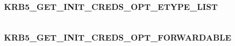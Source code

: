\documentclass[letterpaper,10pt,english]{sphinxmanual}
\begin{document}
\begin{fulllineitems}
\label{appdev/refs/macros/KRB5_GET_INIT_CREDS_OPT_CHG_PWD_PRMPT:KRB5_GET_INIT_CREDS_OPT_CHG_PWD_PRMPT}
\end{fulllineitems}


\begin{tabulary}{\linewidth}{|L|L|}
\hline

 & 
\\
\hline\end{tabulary}



\subsubsection{KRB5\_GET\_INIT\_CREDS\_OPT\_ETYPE\_LIST}
\label{appdev/refs/macros/KRB5_GET_INIT_CREDS_OPT_ETYPE_LIST:krb5-get-init-creds-opt-etype-list-data}\label{appdev/refs/macros/KRB5_GET_INIT_CREDS_OPT_ETYPE_LIST:krb5-get-init-creds-opt-etype-list}\label{appdev/refs/macros/KRB5_GET_INIT_CREDS_OPT_ETYPE_LIST::doc}

\begin{fulllineitems}
\label{appdev/refs/macros/KRB5_GET_INIT_CREDS_OPT_ETYPE_LIST:KRB5_GET_INIT_CREDS_OPT_ETYPE_LIST}
\end{fulllineitems}


\begin{tabulary}{\linewidth}{|L|L|}
\hline

 & 
\\
\hline\end{tabulary}



\subsubsection{KRB5\_GET\_INIT\_CREDS\_OPT\_FORWARDABLE}
\label{appdev/refs/macros/KRB5_GET_INIT_CREDS_OPT_FORWARDABLE::doc}\label{appdev/refs/macros/KRB5_GET_INIT_CREDS_OPT_FORWARDABLE:krb5-get-init-creds-opt-forwardable}\label{appdev/refs/macros/KRB5_GET_INIT_CREDS_OPT_FORWARDABLE:krb5-get-init-creds-opt-forwardable-data}
\end{document}
